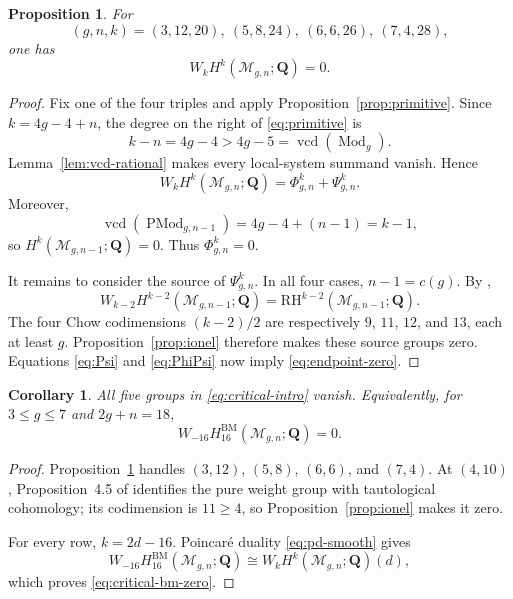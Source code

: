 \documentclass[12pt,reqno]{amsart}
\newcommand{\Q}{\mathbf{Q}}
\newcommand{\M}{\mathcal{M}}
\newcommand{\BM}{\mathrm{BM}}
\newcommand{\RH}{\mathrm{RH}}
\newcommand{\Mod}{\operatorname{Mod}}
\newcommand{\PMod}{\operatorname{PMod}}
\newcommand{\vcd}{\operatorname{vcd}}
\newtheorem{proposition}[theorem]{Proposition}
\newtheorem{corollary}[theorem]{Corollary}
\theoremstyle{definition}
\theoremstyle{remark}
\begin{document}
\begin{proposition}\label{prop:endpoint-vanishing}
For
\[
 (g,n,k)=(3,12,20),\ (5,8,24),\ (6,6,26),\ (7,4,28),
\]
one has
\begin{equation}\label{eq:endpoint-zero}
 W_kH^k(\M_{g,n};\Q)=0.
\end{equation}
\end{proposition}

\begin{proof}
Fix one of the four triples and apply
Proposition~\ref{prop:primitive}.  Since $k=4g-4+n$, the degree on the
right of \eqref{eq:primitive} is
\[
 k-n=4g-4>4g-5=\vcd(\Mod_g).
\]
Lemma~\ref{lem:vcd-rational} makes every local-system summand vanish.
Hence
\begin{equation}\label{eq:PhiPsi}
 W_kH^k(\M_{g,n};\Q)=\Phi^k_{g,n}+\Psi^k_{g,n}.
\end{equation}
Moreover,
\[
 \vcd(\PMod_{g,n-1})=4g-4+(n-1)=k-1,
\]
so $H^k(\M_{g,n-1};\Q)=0$.  Thus $\Phi^k_{g,n}=0$.

It remains to consider the source of $\Psi^k_{g,n}$.  In all four cases,
$n-1=c(g)$.  By \cite[Table~1, Lemma~4.3, and
Proposition~4.5]{CLP},
\[
 W_{k-2}H^{k-2}(\M_{g,n-1};\Q)
 =\RH^{k-2}(\M_{g,n-1};\Q).
\]
The four Chow codimensions $(k-2)/2$ are respectively $9$, $11$, $12$, and
$13$, each at least $g$.  Proposition~\ref{prop:ionel} therefore makes
these source groups zero.  Equations \eqref{eq:Psi} and \eqref{eq:PhiPsi}
now imply \eqref{eq:endpoint-zero}.
\end{proof}

\begin{corollary}\label{cor:critical-vanishing}
All five groups in \eqref{eq:critical-intro} vanish.  Equivalently, for
$3\leq g\leq7$ and $2g+n=18$,
\begin{equation}\label{eq:critical-bm-zero}
 W_{-16}H^{\BM}_{16}(\M_{g,n};\Q)=0.
\end{equation}
\end{corollary}

\begin{proof}
Proposition~\ref{prop:endpoint-vanishing} handles $(3,12)$, $(5,8)$,
$(6,6)$, and $(7,4)$.  At $(4,10)$, Proposition~4.5 of \cite{CLP} identifies the pure
weight group with tautological cohomology; its codimension is $11\geq4$, so
Proposition~\ref{prop:ionel} makes it zero.

For every row, $k=2d-16$.  Poincar\'e duality \eqref{eq:pd-smooth} gives
\[
 W_{-16}H^{\BM}_{16}(\M_{g,n};\Q)
 \cong W_kH^k(\M_{g,n};\Q)(d),
\]
which proves \eqref{eq:critical-bm-zero}.
\end{proof}
\end{document}
